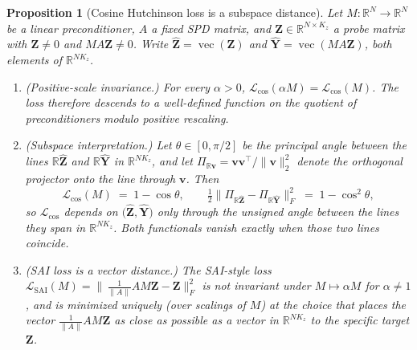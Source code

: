 \documentclass[acmtog,anonymous,review]{acmart}
\theoremstyle{plain}
\newtheorem{proposition}{Proposition}
\begin{document}
\begin{proposition}[Cosine Hutchinson loss is a subspace distance]
\label{prop:cos-subspace}
Let $M:\mathbb{R}^N\!\to\!\mathbb{R}^N$ be a linear preconditioner, $A$ a fixed SPD matrix,
and $\mathbf{Z}\in\mathbb{R}^{N\times K_z}$ a probe matrix with
$\mathbf{Z}\!\ne\!0$ and $MA\mathbf{Z}\!\ne\!0$. Write
$\widehat{\mathbf{Z}}\!=\!\operatorname{vec}(\mathbf{Z})$ and
$\widehat{\mathbf{Y}}\!=\!\operatorname{vec}(MA\mathbf{Z})$, both elements of
$\mathbb{R}^{NK_z}$.
\begin{enumerate}
\item \emph{(Positive-scale invariance.)} For every $\alpha\!>\!0$,
$\mathcal{L}_{\cos}(\alpha M)\!=\!\mathcal{L}_{\cos}(M)$. The loss therefore descends to a
well-defined function on the quotient of preconditioners modulo positive rescaling.
\item \emph{(Subspace interpretation.)} Let $\theta\in[0,\pi/2]$ be the principal angle
between the lines $\mathbb{R}\widehat{\mathbf{Z}}$ and $\mathbb{R}\widehat{\mathbf{Y}}$ in
$\mathbb{R}^{NK_z}$, and let
$\Pi_{\mathbb{R}\mathbf{v}}\!=\!\mathbf{v}\mathbf{v}^\top\!/\|\mathbf{v}\|_2^2$ denote the
orthogonal projector onto the line through $\mathbf{v}$. Then
\begin{equation}
  \mathcal{L}_{\cos}(M) \;=\; 1-\cos\theta,
  \qquad
  \tfrac{1}{2}\bigl\|\Pi_{\mathbb{R}\widehat{\mathbf{Z}}}
              -\Pi_{\mathbb{R}\widehat{\mathbf{Y}}}\bigr\|_F^2
  \;=\; 1-\cos^2\theta,
  \label{eq:cos-proj}
\end{equation}
so $\mathcal{L}_{\cos}$ depends on $\bigl(\widehat{\mathbf{Z}},\widehat{\mathbf{Y}}\bigr)$
only through the unsigned angle between the lines they span in $\mathbb{R}^{NK_z}$. Both
functionals vanish exactly when those two lines coincide.
\item \emph{(SAI loss is a vector distance.)} The SAI-style loss
$\mathcal{L}_{\mathrm{SAI}}(M)\!=\!\bigl\|\,\tfrac{1}{\|A\|}AM\mathbf{Z}-\mathbf{Z}\bigr\|_F^2$
is \emph{not} invariant under $M\!\mapsto\!\alpha M$ for $\alpha\!\ne\!1$, and is minimized
uniquely (over scalings of $M$) at the choice that places the vector
$\tfrac{1}{\|A\|}AM\mathbf{Z}$ as close as possible \emph{as a vector in $\mathbb{R}^{NK_z}$}
to the specific target $\mathbf{Z}$.
\end{enumerate}
\end{proposition}
\end{document}
